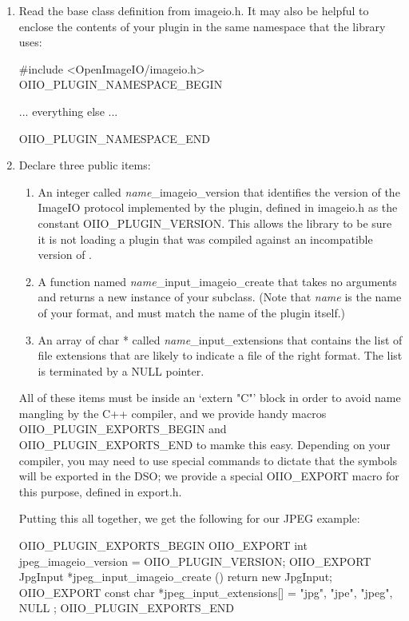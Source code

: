 \begin{enumerate}
\item Read the base class definition from {\fn imageio.h}.  It may also
  be helpful to enclose the contents of your plugin in the same
  namespace that the \product library uses:

  \begin{code}
    #include <OpenImageIO/imageio.h>
    OIIO_PLUGIN_NAMESPACE_BEGIN

    ... everything else ...

    OIIO_PLUGIN_NAMESPACE_END
  \end{code}

\item Declare three public items:

  \begin{enumerate}
    \item An integer called \emph{name}{\cf _imageio_version} that identifies
      the version of the ImageIO protocol implemented by the plugin,
      defined in {\fn imageio.h} as the constant {\cf OIIO_PLUGIN_VERSION}.
      This allows the library to be sure it is not loading a plugin
      that was compiled against an incompatible version of \product.
    \item A function named \emph{name}{\cf _input_imageio_create} that
      takes no arguments and returns a new instance of your \ImageInput
      subclass.  (Note that \emph{name} is the name of your format,
      and must match the name of the plugin itself.)
    \item An array of {\cf char *} called \emph{name}{\cf _input_extensions}
      that contains the list of file extensions that are likely to indicate
      a file of the right format.  The list is terminated by a {\cf NULL}
      pointer.
  \end{enumerate}

  All of these items must be inside an `{\cf extern "C"}' block in order
  to avoid name mangling by the C++ compiler, and we provide handy
  macros {\cf OIIO_PLUGIN_EXPORTS_BEGIN} and {\cf OIIO_PLUGIN_EXPORTS_END}
  to mamke this easy.  Depending on your
  compiler, you may need to use special commands to dictate that the
  symbols will be exported in the DSO; we provide a special {\cf
  OIIO_EXPORT} macro for this purpose, defined in {\fn export.h}.

  Putting this all together, we get the following for our JPEG example:

  \begin{code}
    OIIO_PLUGIN_EXPORTS_BEGIN
        OIIO_EXPORT int jpeg_imageio_version = OIIO_PLUGIN_VERSION;
        OIIO_EXPORT JpgInput *jpeg_input_imageio_create () {
            return new JpgInput;
        }
        OIIO_EXPORT const char *jpeg_input_extensions[] = {
            "jpg", "jpe", "jpeg", NULL
        };
    OIIO_PLUGIN_EXPORTS_END
  \end{code}


\end{enumerate}
